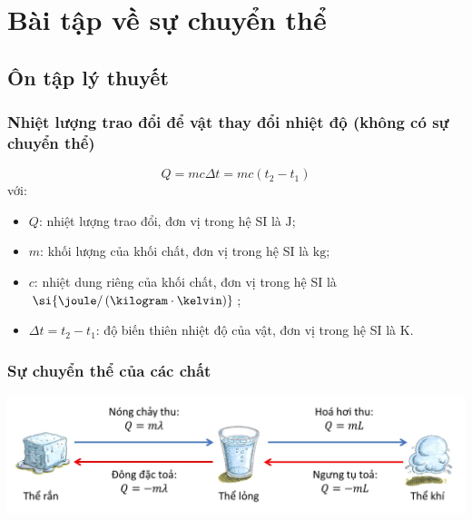 \let\lesson\undefined
\newcommand{\lesson}{\phantomlesson{Bài 4: Nhiệt dung riêng, nhiệt nóng chảy riêng, nhiệt hoá hơi riêng}}
\chapter[Bài tập về sự chuyển thể]{Bài tập về sự chuyển thể}
\section{Ôn tập lý thuyết}
\subsection{Nhiệt lượng trao đổi để vật thay đổi nhiệt độ (không có sự chuyển thể)}
\begin{equation}
	Q=mc\Delta t=mc\left(t_2-t_1\right)
\end{equation}
với:
\begin{itemize}
	\item $Q$: nhiệt lượng trao đổi, đơn vị trong hệ SI là $\si{\joule}$;
	\item $m$: khối lượng của khối chất, đơn vị trong hệ SI là $\si{\kilogram}$;
	\item $c$: nhiệt dung riêng của khối chất, đơn vị trong hệ SI là $\si{\joule/\left(\kilogram\cdot\kelvin\right)}$;
	\item $\Delta t=t_2-t_1$: độ biến thiên nhiệt độ của vật, đơn vị trong hệ SI là $\si{\kelvin}$.
\end{itemize}
\subsection{Sự chuyển thể của các chất}
\begin{center}
	\includegraphics[width=0.8\linewidth]{../figs/VN12-Y24-PH-SYL-006-1}
\end{center}
